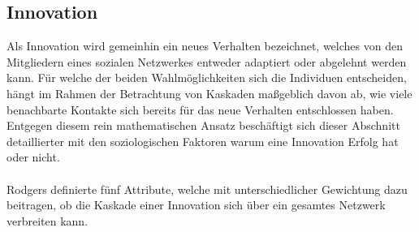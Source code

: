 \documentclass[12pt]{article}
\begin{document}
\subsection{Innovation}
Als Innovation wird gemeinhin ein neues Verhalten bezeichnet, welches von den Mitgliedern eines sozialen Netzwerkes entweder adaptiert oder abgelehnt werden kann. Für welche der beiden Wahlmöglichkeiten sich die Individuen entscheiden, hängt im Rahmen der Betrachtung von Kaskaden maßgeblich davon ab, wie viele benachbarte Kontakte sich bereits für das neue Verhalten entschlossen haben. Entgegen diesem rein mathematischen Ansatz beschäftigt sich dieser Abschnitt detaillierter mit den soziologischen Faktoren warum eine Innovation Erfolg hat oder nicht.\\\\
Rodgers definierte fünf Attribute, welche mit unterschiedlicher Gewichtung dazu beitragen, ob die Kaskade einer Innovation sich über ein gesamtes Netzwerk verbreiten kann.
\end{document}
